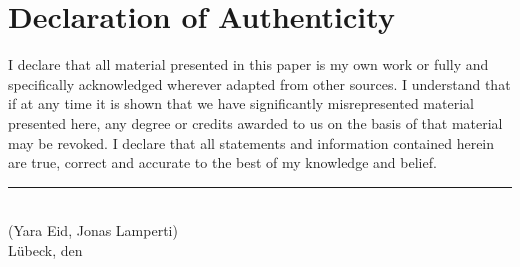 
\cleardoublepage
\thispagestyle{plain}
\vspace*{\fill}

\section*{Declaration of Authenticity}
I declare that all material presented in this paper is my own work or fully and
specifically acknowledged wherever adapted from other sources.
I understand that if at any time it is shown that we have significantly misrepresented
material presented here, any degree or credits awarded to us on the basis of that
material may be revoked.
I declare that all statements and information contained herein are true, correct and
accurate to the best of my knowledge and belief.

\vskip2cm

\rule{5cm}{0.4pt}\\
(Yara Eid, Jonas Lamperti)\\
Lübeck, den \duedate